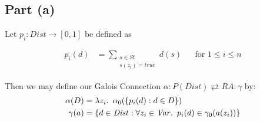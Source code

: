 \subsection{Part (a)}\label{sec:q-3-a}

Let $p_i : \mathit{Dist}\to[0,1]$ be defined as

\begin{align*}
  p_i(d) & = \sum_{\substack{s\in\mathit{St}\\s(z_i) = \mathit{true}}}d(s) && \text{for }1\leq i\leq n
\end{align*}

Then we may define our Galois Connection $\alpha : P(\mathit{Dist})\rightleftarrows \mathit{RA} : \gamma$ by:
\begin{align*}
  \alpha(D) & = \lambda z_i\ldotp~\alpha_0(\{p_i(d) : d\in D\}) \\
  \gamma(a) & = \{d\in\mathit{Dist}:\forall z_i\in\mathit{Var}\ldotp~p_i(d)\in\gamma_0(a(z_i))\}
\end{align*}

